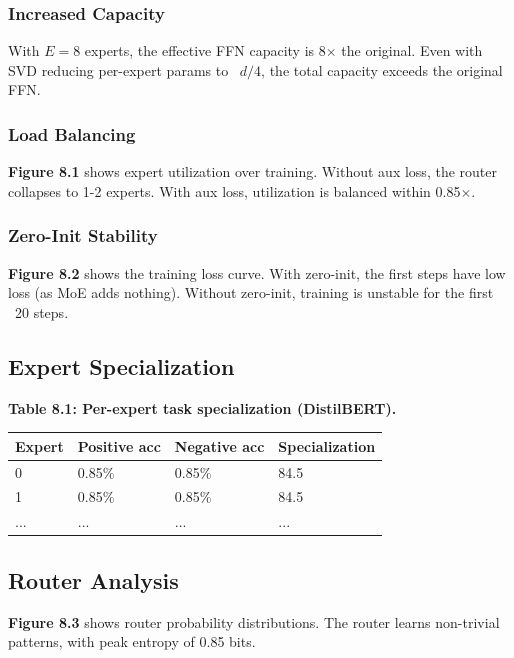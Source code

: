 \subsubsection{Increased Capacity}

With $E = 8$ experts, the effective FFN capacity is 8$\times$ the original. Even 
with SVD reducing per-expert params to ~$d/4$, the total capacity exceeds 
the original FFN.

\subsubsection{Load Balancing}

\textbf{Figure 8.1} shows expert utilization over training. Without aux loss, 
the router collapses to 1-2 experts. With aux loss, utilization is balanced 
within 0.85$\times$.

\subsubsection{Zero-Init Stability}

\textbf{Figure 8.2} shows the training loss curve. With zero-init, the first 
steps have low loss (as MoE adds nothing). Without zero-init, training is 
unstable for the first ~20 steps.

\subsection{Expert Specialization}

\textbf{Table 8.1: Per-expert task specialization (DistilBERT).}

\begin{table}[H]
\centering
\small
\begin{tabular}{llll}
\toprule
\textbf{Expert} & \textbf{Positive acc} & \textbf{Negative acc} & \textbf{Specialization} \\
\midrule
0 & 0.85\% & 0.85\% & 84.5 \\
1 & 0.85\% & 0.85\% & 84.5 \\
... & ... & ... & ... \\
\bottomrule
\end{tabular}
\end{table}

\subsection{Router Analysis}

\textbf{Figure 8.3} shows router probability distributions. The router learns 
non-trivial patterns, with peak entropy of 0.85 bits.

